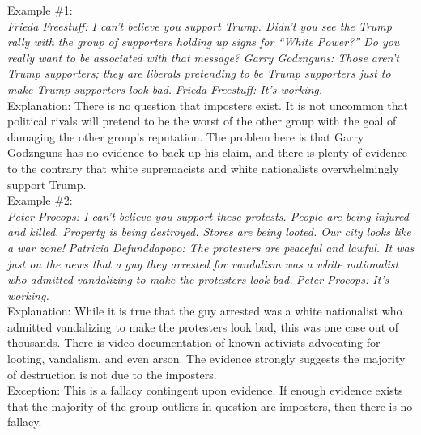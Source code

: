 \documentclass[a4paper,12pt,single,pdftex]{scrbook}
\begin{document}
    
      Example \#1:
    \\

    
      {\em Frieda Freestuff: I can’t believe you support Trump. Didn’t you see the Trump rally with the group of supporters holding up signs for “White Power?” Do you really want to be associated with that message?} \newline
{\em Garry Godznguns: Those aren’t Trump supporters; they are liberals pretending to be Trump supporters just to make Trump supporters look bad.} \newline
{\em Frieda Freestuff: It’s working.}
    \\

    
      Explanation: There is no question that imposters exist. It is not uncommon that political rivals will pretend to be the worst of the other group with the goal of damaging the other group’s reputation. The problem here is that Garry Godznguns has no evidence to back up his claim, and there is plenty of evidence to the contrary that white supremacists and white nationalists overwhelmingly support Trump.
    \\

    
      Example \#2:
    \\

    
      {\em Peter Procops: I can’t believe you support these protests. People are being injured and killed. Property is being destroyed. Stores are being looted. Our city looks like a war zone!} \newline
{\em Patricia Defunddapopo: The protesters are peaceful and lawful. It was just on the news that a guy they arrested for vandalism was a white nationalist who admitted vandalizing to make the protesters look bad.} \newline
{\em Peter Procops: It’s working.}
    \\

    
      Explanation: While it is true that the guy arrested was a white nationalist who admitted vandalizing to make the protesters look bad, this was one case out of thousands. There is video documentation of known activists advocating for looting, vandalism, and even arson. The evidence strongly suggests the majority of destruction is not due to the imposters.
    \\

    
      Exception: This is a fallacy contingent upon evidence. If enough evidence exists that the majority of the group outliers in question are imposters, then there is no fallacy.
    \\
\end{document}
